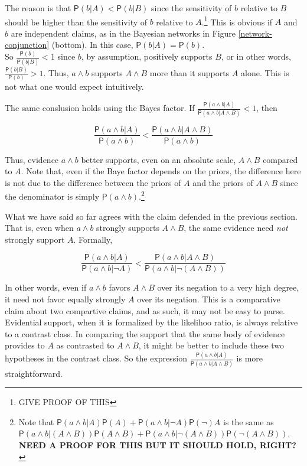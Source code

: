 \documentclass[
  10pt,
  dvipsnames,enabledeprecatedfontcommands]{scrartcl}
\newcommand{\pr}[1]{\mathsf{P}(#1)}
\begin{document}
\noindent The reason is that \(\pr{b \vert A} < \pr{b \vert B}\) since
the sensitivity of \(b\) relative to \(B\) should be higher than the
sensitivity of \(b\) relative to \(A\).\footnote{GIVE PROOF OF THIS}
This is obvious if \(A\) and \(b\) are independent claims, as in the
Bayesian networks in Figure \ref{network-conjunction} (bottom). In this
case, \(\pr{b \vert A}=\pr{b}\).\\
So \(\frac{\pr{b}}{\pr{b \vert B}}<1\) since \(b\), by assumption,
positively supports \(B\), or in other words,
\(\frac{\pr{b \vert B}}{\pr{b}}>1\). Thus, \(a\wedge b\) supports
\(A\wedge B\) more than it supports \(A\) alone. This is not what one
would expect intuitively.

The same conslusion holds using the Bayes factor. If
\(\frac{\pr{a\wedge b \vert A}}{\pr{a\wedge b \vert A \wedge B}}<1\),
then

\[\frac{\pr{a\wedge b \vert A}}{\pr{a\wedge b}} < \frac{\pr{a\wedge b \vert A \wedge B}}{\pr{a\wedge b}}   \]

\noindent Thus, evidence \(a\wedge b\) better supports, even on an
absolute scale, \(A \wedge B\) compared to \(A\). Note that, even if the
Baye factor depends on the priors, the difference here is not due to the
difference between the priors of \(A\) and the priors of \(A\wedge B\)
since the denominator is simply
\(\pr{a\wedge b}\).\footnote{Note that $\pr{a\wedge b \vert A}\pr{A}+ \pr{a\wedge b \vert \neg A}\pr\neg {A}$ is the same as $\pr{a\wedge b \vert (A\wedge B)}\pr{A\wedge B}+ \pr{a\wedge b \vert \neg (A\wedge B)}\pr{\neg (A\wedge B)}$. \textbf{NEED A PROOF FOR THIS BUT IT SHOULD HOLD, RIGHT?}}

What we have said so far agrees with the claim defended in the previous
section. That is, even when \(a\wedge b\) strongly supports
\(A \wedge B\), the same evidence need \textit{not} strongly support
\(A\). Formally,

\[\frac{\pr{a\wedge b \vert A}}{\pr{a\wedge b \vert \neg A}} < \frac{\pr{a\wedge b \vert A \wedge B}}{\pr{a\wedge b \vert \neg (A \wedge B)}}\]

\noindent In other words, even if \(a\wedge b\) favors \(A\wedge B\)
over its negation to a very high degree, it need not favor equally
strongly \(A\) over its negation. This is a comparative claim about two
compartive claims, and as such, it may not be easy to parse. Evidential
support, when it is formalized by the likelihoo ratio, is always
relative to a contrast class. In comparing the support that the same
body of evidence provides to \(A\) as contrasted to \(A\wedge B\), it
might be better to include these two hypotheses in the contrast class.
So the expression
\(\frac{\pr{a\wedge b \vert A}}{\pr{a\wedge b \vert A \wedge B}}\) is
more straightforward.
\end{document}
